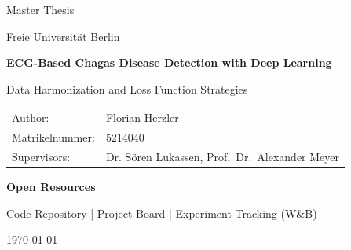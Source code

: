 \begin{titlepage}
    \thispagestyle{empty}
    \centering

    {\Large Master Thesis\par}
    \vspace{0.6cm}
    {\large Freie Universit\"at Berlin\par}
    \vspace{1.2cm}

    {\huge\bfseries ECG-Based Chagas Disease Detection with Deep Learning\par}
    \vspace{1.25cm}
    {\Large Data Harmonization and Loss Function Strategies\par}
    \vspace{2.4cm}

    {\large
        \begin{tabular}{@{}l l@{}}
            Author:         & Florian Herzler                                   \\
            Matrikelnummer: & 5214040                                           \\
            Supervisors:    & Dr. S\"oren Lukassen, Prof.\ Dr.\ Alexander Meyer \\
        \end{tabular}\par
    }
    \vspace{2.8cm}

    {\small\textbf{Open Resources}\par}
    {\small
        \href{https://github.com/floherzler/ecg-chagas-embeddings}{Code Repository} \enspace|\enspace
        \href{https://github.com/users/floherzler/projects/1}{Project Board} \enspace|\enspace
        \href{https://wandb.ai/ag-lukassen/ecg-chagas-embeddings-cli}{Experiment Tracking (W\&B)}\par
    }
    \vfill

    {\large \today\par}
\end{titlepage}
